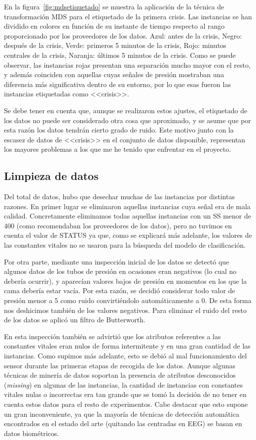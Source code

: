 En la figura~\ref{fig:mdsetiquetado} se muestra la aplicación de la técnica de transformación MDS para el etiquetado de la primera crisis. Las instancias se han dividido en colores en función de su instante de tiempo respecto al rango proporcionado por los proveedores de los datos. Azul: antes de la crisis, Negro: después de la crisis, Verde: primeros 5 minutos de la crisis, Rojo: minutos centrales de la crisis, Naranja: últimos 5 minutos de la crisis. Como se puede observar, las instancias rojas presentan una separación mucho mayor con el resto, y además coinciden con aquellas cuyas señales de presión mostraban una diferencia más significativa dentro de su entorno, por lo que esas fueron las instancias etiquetadas como <<crisis>>. 

Se debe tener en cuenta que, aunque se realizaron estos ajustes, el etiquetado de los datos no puede ser considerado otra cosa que aproximado, y se asume que por esta razón los datos tendrán cierto grado de ruido. Este motivo junto con la escasez de datos de <<crisis>> en el conjunto de datos disponible, representan los mayores problemas a los que me he tenido que enfrentar en el proyecto. 

\subsection{Limpieza de datos}

Del total de datos, hubo que desechar muchas de las instancias por distintas razones. En primer lugar se eliminaron aquellas instancias cuya señal era de mala calidad. Concretamente eliminamos todas aquellas instancias con un SS menor de 400 (como recomendaban los proveedores de los datos), pero no tuvimos en cuenta el valor de STATUS ya que, como se explicará más adelante, los valores de las constantes vitales no se usaron para la búsqueda del modelo de clasificación.

Por otra parte, mediante una inspección inicial de los datos se detectó que algunos datos de los tubos de presión en ocasiones eran negativos (lo cual no debería ocurrir), y aparecían valores bajos de presión en momentos en los que la cama debería estar vacía. Por esta razón, se decidió considerar todo valor de presión menor a 5 como ruido convirtiéndolo automáticamente a 0. De esta forma nos deshicimos también de los valores negativos. Para eliminar el ruido del resto de los datos se aplicó un filtro de Butterworth.

En esta inspección también se advirtió que los atributos referentes a las constantes vitales eran nulos de forma intermitente y en una gran cantidad de las instancias. Como supimos más adelante, esto se debió al mal funcionamiento del sensor durante las primeras etapas de recogida de los datos. Aunque algunas técnicas de minería de datos soportan la presencia de atributos desconocidos (\textit{missing}) en algunas de las instancias, la cantidad de instancias con constantes vitales nulas o incorrectas era tan grande que se tomó la decisión de no tener en cuenta estos datos para el resto de experimentos. Cabe destacar que esto supone un gran inconveniente, ya que la mayoría de técnicas de detección automática encontrados en el estado del arte (quitando las centradas en EEG) se basan en datos biométricos. 

